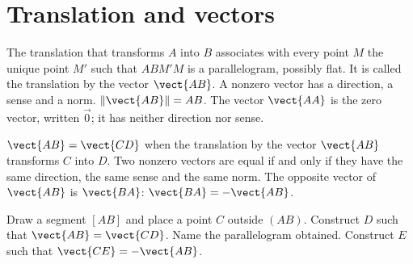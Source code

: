 \section{Translation and vectors}
\begin{keypoint}[Definition]
The translation that transforms $A$ into $B$ associates with every point $M$ the unique point $M'$ such that $ABM'M$ is a parallelogram, possibly flat. It is called the translation by the vector $\vect{AB}$.
A nonzero vector has a direction, a sense and a norm. $\|\vect{AB}\|=AB$. The vector $\vect{AA}$ is the zero vector, written $\vec0$; it has neither direction nor sense.
\end{keypoint}
\begin{center}\end{center}
\begin{keypoint}
$\vect{AB}=\vect{CD}$ when the translation by the vector $\vect{AB}$ transforms $C$ into $D$. Two nonzero vectors are equal if and only if they have the same direction, the same sense and the same norm.
The opposite vector of $\vect{AB}$ is $\vect{BA}$: $\vect{BA}=-\vect{AB}$.
\end{keypoint}
\begin{example}Draw a segment $[AB]$ and place a point $C$ outside $(AB)$. Construct $D$ such that $\vect{AB}=\vect{CD}$. Name the parallelogram obtained. Construct $E$ such that $\vect{CE}=-\vect{AB}$.\end{example}

